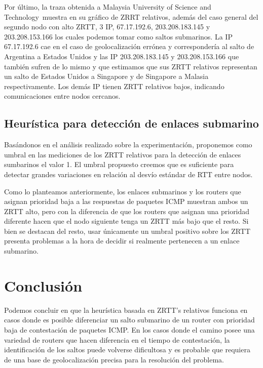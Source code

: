 \documentclass[a4paper, 10pt, twoside]{article}
\newcommand{\must}{Malaysia University of Science and Technology}
\begin{document}
Por último, la traza obtenida a \must \ muestra en su gráfico de ZRRT relativos, además del caso general del segundo nodo con alto ZRTT, 3 IP, 67.17.192.6, 203.208.183.145 y 203.208.153.166 los cuales podemos tomar como saltos submarinos. La IP 67.17.192.6 cae en el caso de geolocalización errónea y correspondería al salto de Argentina a Estados Unidos y las IP 203.208.183.145 y 203.208.153.166 que también sufren de lo mismo y que estimamos que sus ZRTT relativos representan un salto de Estados Unidos a Singapore y de Singapore a Malasia respectivamente. Los demás IP tienen ZRTT relativos bajos, indicando comunicaciones entre nodos cercanos.

\subsection{Heurística para detección de enlaces submarino}
Basándonos en el análisis realizado sobre la experimentación, proponemos como umbral en las mediciones de los ZRTT relativos para la detección de enlaces sumbarinos el valor 1. El umbral propuesto creemos que es suficiente para detectar grandes variaciones en relación al desvío estándar de RTT entre nodos.

Como lo planteamos anteriormente, los enlaces submarinos y los routers que asignan prioridad baja a las respuestas de paquetes ICMP muestran ambos un ZRTT alto, pero con la diferencia de que los routers que asignan una prioridad diferente hacen que el nodo siguiente tenga un ZRTT más bajo que el resto. Si bien se destacan del resto, usar únicamente un umbral positivo sobre los ZRTT presenta problemas a la hora de decidir si realmente pertenecen a un enlace submarino.



\section{Conclusión}

Podemos concluir en que la heurística basada en ZRTT's relativos funciona en casos donde es posible diferenciar un salto submarino de un router con prioridad baja de contestación de paquetes ICMP. En los casos donde el camino posee una variedad de routers que hacen diferencia en el tiempo de contestación, la identificación de los saltos puede volverse dificultosa y es probable que requiera de una base de geolocalización precisa para la resolución del problema.
\end{document}
